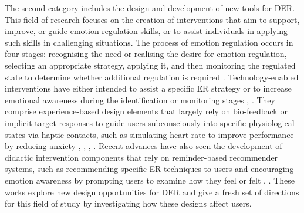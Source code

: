 \documentclass[acmtog]{acmart}
\begin{document}
The second category includes the design and development of new tools for DER. This field of research focuses on the creation of interventions that aim to support, improve, or guide emotion regulation skills, or to assist individuals in applying such skills in challenging situations. The process of emotion regulation occurs in four stages: recognising the need or realising the desire for emotion regulation, selecting an appropriate strategy, applying it, and then monitoring the regulated state to determine whether additional regulation is required \cite{wadley2020digital}. Technology-enabled interventions have either intended to assist a specific ER strategy or to increase emotional awareness during the identification or monitoring stages \cite{smith2022digital}, \cite{slovak2022designing}. They comprise experience-based design elements that largely rely on bio-feedback or implicit target responses to guide users subconsciously into specific physiological states via haptic contacts, such as simulating heart rate to improve performance by reducing anxiety \cite{miri2020evaluating}, \cite{newbold2017using}, \cite{mancini2020room}, \cite{paredes2018just}. Recent advances have also seen the development of didactic intervention components that rely on reminder-based recommender systems, such as recommending specific ER techniques to users and encouraging emotion awareness by prompting users to examine how they feel or felt \cite{chen2016promoting}, \cite{costa2019boostmeup}. These works explore new design opportunities for DER and give a fresh set of directions for this field of study by investigating how these designs affect users.
\end{document}
